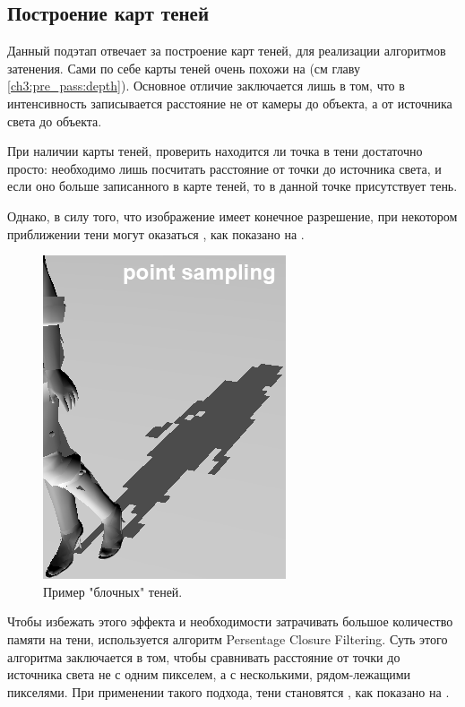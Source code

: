 	\subsection{Построение карт теней} \label{ch3:pre_pass:shadow_maps}
		Данный подэтап отвечает за построение карт теней, для реализации алгоритмов затенения\cite{williams1978casting}. Сами по себе карты теней очень похожи на  (см главу \ref{ch3:pre_pass:depth}). Основное отличие заключается лишь в том, что в интенсивность записывается расстояние не от камеры до объекта, а от источника света до объекта.
		
		При наличии карты теней, проверить находится ли точка в тени достаточно просто: необходимо лишь посчитать расстояние от точки до источника света, и если оно больше записанного в карте теней, то в данной точке присутствует тень.
		
		Однако, в силу того, что изображение имеет конечное разрешение, при некотором приближении тени могут оказаться , как показано на .
		 
		 \begin{figure}[ht!] 
		 	\center
		 	\includegraphics [scale=1] {my_folder/images//blocky_shadows}	
		 	\caption{Пример "блочных" теней.} 
		 	\label{fig:blocky_shadows}
		 \end{figure}
		 
		 Чтобы избежать этого эффекта и необходимости затрачивать большое количество памяти на тени, используется алгоритм Persentage Closure Filtering\cite{fernando2005percentage}. Суть этого алгоритма заключается в том, чтобы сравнивать расстояние от точки до источника света не с одним пикселем, а с несколькими, рядом-лежащими пикселями. При применении такого подхода, тени становятся , как показано на .
		 
